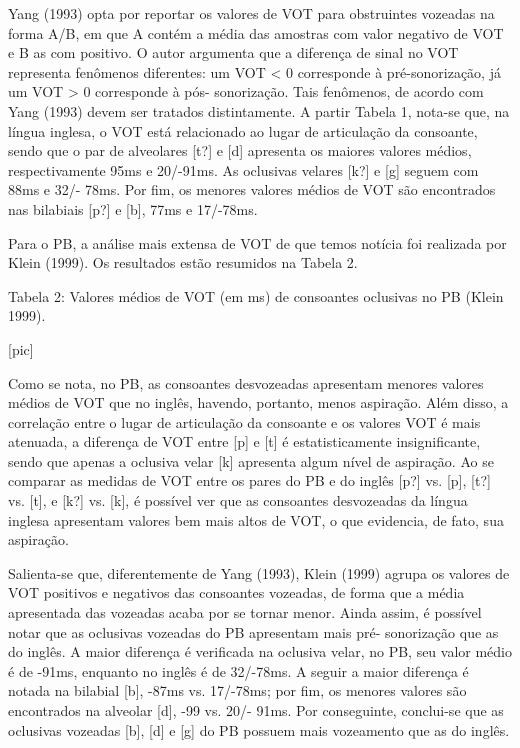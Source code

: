 Yang (1993) opta por reportar os valores de VOT para obstruintes
vozeadas na forma A/B, em que A cont\'em a m\'edia das amostras com valor
negativo de VOT e B as com positivo. O autor argumenta que a diferen\c{c}a
de sinal no VOT representa fen\^omenos diferentes: um VOT \textless{} 0
corresponde à pr\'e-sonoriza\c{c}\~ao, j\'a um VOT \textgreater{} 0 corresponde à
p\'os- sonoriza\c{c}\~ao. Tais fen\^omenos, de acordo com Yang (1993) devem ser
tratados distintamente. A partir Tabela 1, nota-se que, na l\'ingua
inglesa, o VOT est\'a relacionado ao lugar de articula\c{c}\~ao da consoante,
sendo que o par de alveolares {[}t?{]} e {[}d{]} apresenta os maiores
valores m\'edios, respectivamente 95ms e 20/-91ms. As oclusivas velares
{[}k?{]} e {[}g{]} seguem com 88ms e 32/- 78ms. Por fim, os menores
valores m\'edios de VOT s\~ao encontrados nas bilabiais {[}p?{]} e {[}b{]},
77ms e 17/-78ms.

Para o PB, a an\'alise mais extensa de VOT de que temos not\'icia foi
realizada por Klein (1999). Os resultados est\~ao resumidos na Tabela 2.

        Tabela 2: Valores m\'edios de VOT (em ms) de consoantes
                    oclusivas no PB (Klein 1999).

                                [pic]

Como se nota, no PB, as consoantes desvozeadas apresentam menores
valores m\'edios de VOT que no ingl\^es, havendo, portanto, menos aspira\c{c}\~ao.
Al\'em disso, a correla\c{c}\~ao entre o lugar de articula\c{c}\~ao da consoante e os
valores VOT \'e mais atenuada, a diferen\c{c}a de VOT entre {[}p{]} e {[}t{]}
\'e estatisticamente insignificante, sendo que apenas a oclusiva velar
{[}k{]} apresenta algum n\'ivel de aspira\c{c}\~ao. Ao se comparar as medidas de
VOT entre os pares do PB e do ingl\^es {[}p?{]} vs. {[}p{]}, {[}t?{]} vs.
{[}t{]}, e {[}k?{]} vs. {[}k{]}, \'e poss\'ivel ver que as consoantes
desvozeadas da l\'ingua inglesa apresentam valores bem mais altos de VOT,
o que evidencia, de fato, sua aspira\c{c}\~ao.

Salienta-se que, diferentemente de Yang (1993), Klein (1999) agrupa os
valores de VOT positivos e negativos das consoantes vozeadas, de forma
que a m\'edia apresentada das vozeadas acaba por se tornar menor. Ainda
assim, \'e poss\'ivel notar que as oclusivas vozeadas do PB apresentam mais
pr\'e- sonoriza\c{c}\~ao que as do ingl\^es. A maior diferen\c{c}a \'e verificada na
oclusiva velar, no PB, seu valor m\'edio \'e de -91ms, enquanto no ingl\^es \'e
de 32/-78ms. A seguir a maior diferen\c{c}a \'e notada na bilabial {[}b{]},
-87ms vs. 17/-78ms; por fim, os menores valores s\~ao encontrados na
alveolar {[}d{]}, -99 vs. 20/- 91ms. Por conseguinte, conclui-se que as
oclusivas vozeadas {[}b{]}, {[}d{]} e {[}g{]} do PB possuem mais
vozeamento que as do ingl\^es.

